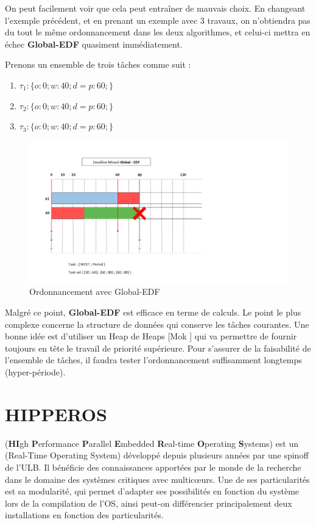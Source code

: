 	On peut facilement voir que cela peut entraîner de \og{}mauvais choix\fg{}. 
	En changeant l'exemple précédent, et en prenant un exemple avec 3 travaux, 
	on n'obtiendra pas du tout le même ordonnancement dans les deux algorithmes, 
	et celui-ci mettra en échec \textbf{Global-EDF} quasiment immédiatement.\newline
	
	Prenons un ensemble de trois tâches comme suit :

	\begin{enumerate}
		\setlength\itemsep{0.1em}
		\item $\tau_1 : \{o:0; w:40; d=p:60;\}$
		\item $\tau_2 : \{o:0; w:40; d=p:60;\}$
		\item $\tau_3 : \{o:0; w:40; d=p:60;\}$
	\end{enumerate}
	
	\begin{figure}[H]
		\label{3tasksgedfnonoptimal}
		\caption{Ordonnancement avec Global-EDF}
		\includegraphics[scale=0.7]{img/wcet/deadlineMiss}
	\end{figure}	
	
	Malgré ce point, \textbf{Global-EDF} est \og{}efficace\fg{} en terme de calculs.
	Le point le plus complexe concerne la structure de données qui conserve les 
	tâches courantes. Une bonne idée est d'utiliser un Heap de Heaps [Mok \cite{mok}] qui 
	va permettre de fournir toujours en tête le travail de priorité supérieure.
	Pour s'assurer de la faisabilité de l'ensemble de tâches, 
	il faudra tester l'ordonnancement suffisamment longtemps (hyper-période).\newline

		
\section{HIPPEROS}
	 (\textbf{HI}gh \textbf{P}erformance \textbf{P}arallel \textbf{E}mbedded \textbf{R}eal-time \textbf{O}perating \textbf{S}ystems)
	est un  (Real-Time Operating System) développé depuis plusieurs années par une spinoff de l'ULB.
	Il bénéficie des connaissances apportées par le monde de la recherche dans 
	le domaine des systèmes critiques avec multic\oe{}urs. Une de ses particularités 
	est sa modularité, qui permet d'adapter ses possibilités en fonction du système 
	lors de la compilation de l'OS, ainsi peut-on différencier principalement 
	deux installations en fonction des particularités. 
	
